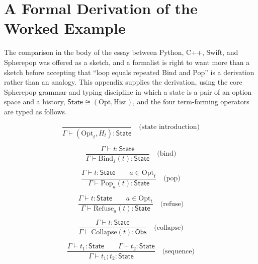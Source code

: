 \documentclass[11pt]{article}
\begin{document}
\appendix

\section{A Formal Derivation of the Worked Example}
\label{app:derivation}

The comparison in the body of the essay between Python, C++, Swift, and Spherepop was offered as a sketch, and a formalist is right to want more than a sketch before accepting that ``loop equals repeated Bind and Pop'' is a derivation rather than an analogy. This appendix supplies the derivation, using the core Spherepop grammar and typing discipline in which a state is a pair of an option space and a history, $\mathsf{State} \cong (\mathrm{Opt}, \mathrm{Hist})$, and the four term-forming operators are typed as follows.

\[
\dfrac{}{\Gamma \vdash (\mathrm{Opt}_t, H_t) : \mathsf{State}} \quad \text{(state introduction)}
\]

\[
\dfrac{\Gamma \vdash t : \mathsf{State}}{\Gamma \vdash \mathrm{Bind}_f(t) : \mathsf{State}} \quad \text{(bind)}
\]

\[
\dfrac{\Gamma \vdash t : \mathsf{State} \qquad a \in \mathrm{Opt}_t}{\Gamma \vdash \mathrm{Pop}_a(t) : \mathsf{State}} \quad \text{(pop)}
\]

\[
\dfrac{\Gamma \vdash t : \mathsf{State} \qquad a \in \mathrm{Opt}_t}{\Gamma \vdash \mathrm{Refuse}_a(t) : \mathsf{State}} \quad \text{(refuse)}
\]

\[
\dfrac{\Gamma \vdash t : \mathsf{State}}{\Gamma \vdash \mathrm{Collapse}(t) : \mathsf{Obs}} \quad \text{(collapse)}
\]

\[
\dfrac{\Gamma \vdash t_1 : \mathsf{State} \qquad \Gamma \vdash t_2 : \mathsf{State}}{\Gamma \vdash t_1 ; t_2 : \mathsf{State}} \quad \text{(sequence)}
\]
\end{document}
